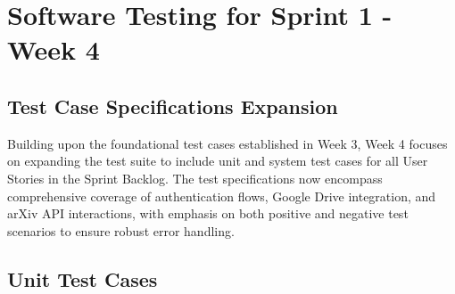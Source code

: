 \documentclass[12pt]{article}
\begin{document}
\section{Software Testing for Sprint 1 - Week 4}

\subsection{Test Case Specifications Expansion}
Building upon the foundational test cases established in Week 3, Week 4 focuses on expanding the test suite to include unit and system test cases for all User Stories in the Sprint Backlog. The test specifications now encompass comprehensive coverage of authentication flows, Google Drive integration, and arXiv API interactions, with emphasis on both positive and negative test scenarios to ensure robust error handling.

\subsection{Unit Test Cases}
\end{document}
